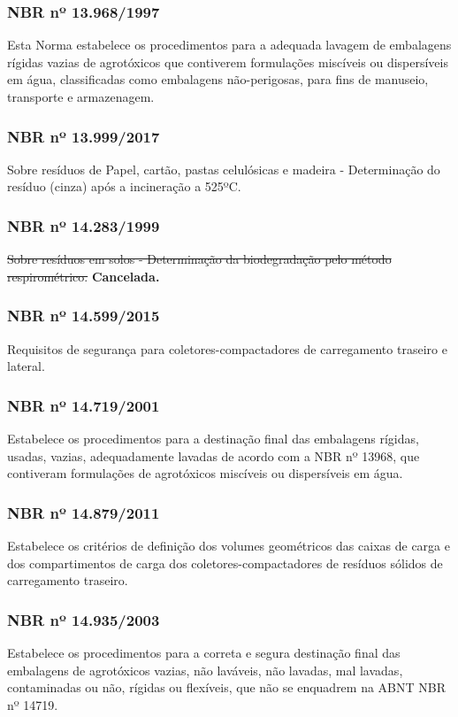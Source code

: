 \begin{subapend}
\begin{subsubapend}
		\subsubsection{NBR nº 13.968/1997}
		Esta Norma estabelece os procedimentos para a adequada lavagem de embalagens rígidas vazias de agrotóxicos que contiverem formulações miscíveis ou dispersíveis em água, classificadas como embalagens não-perigosas, para fins de manuseio, transporte e armazenagem.
		\subsubsection{NBR nº 13.999/2017}
		Sobre resíduos de Papel, cartão, pastas celulósicas e madeira - Determinação do resíduo (cinza) após a incineração a 525ºC.
		\subsubsection{NBR nº 14.283/1999}
		\sout{Sobre resíduos em solos - Determinação da biodegradação pelo método respirométrico.} \textbf{Cancelada.}
		\subsubsection{NBR nº 14.599/2015}
		Requisitos de segurança para coletores-compactadores de carregamento traseiro e lateral.
		\subsubsection{NBR nº 14.719/2001}
		Estabelece os procedimentos para a destinação final das embalagens rígidas, usadas, vazias, adequadamente lavadas de acordo com a NBR nº 13968, que contiveram formulações de agrotóxicos miscíveis ou dispersíveis em água.
		\subsubsection{NBR nº 14.879/2011}
		Estabelece os critérios de definição dos volumes geométricos das caixas de carga e dos compartimentos de carga dos coletores-compactadores de resíduos sólidos de carregamento traseiro.
		\subsubsection{NBR nº 14.935/2003}
		Estabelece os procedimentos para a correta e segura destinação final das embalagens de agrotóxicos vazias, não laváveis, não lavadas, mal lavadas, contaminadas ou não, rígidas ou flexíveis, que não se enquadrem na ABNT NBR nº 14719.

\end{subsubapend}
\end{subapend}

